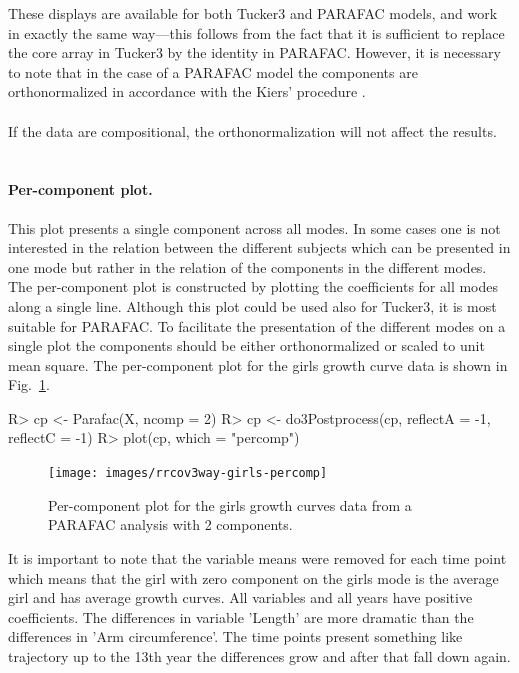 \documentclass[article,shortnames, nojss]{jss}
\begin{document}
These displays are available for both Tucker3 and PARAFAC models, and
work in exactly the same way---this follows from the fact that
it is sufficient to replace the core array in Tucker3 by the
identity in PARAFAC. However, it is necessary to note that in the case of
a PARAFAC model the components are orthonormalized in accordance with
the Kiers' procedure \citep{kiers2000some}.\\\\
If the data are compositional, the orthonormalization will not affect the results.\\\\
\paragraph{Per-component plot.} This plot presents a single component across all modes.
In some cases one is not interested in the relation between the
different subjects which can be presented in one mode but rather in the relation
of the components in the different modes. The per-component plot is
constructed by plotting the coefficients for all modes along a single line.
Although this plot could be used also for Tucker3, it is most
suitable for PARAFAC. To facilitate the presentation of the different modes
on a single plot the components should be either orthonormalized or
scaled to unit mean square. The per-component plot for the girls
growth curve data is shown in Fig.~\ref{fig-girls-percomp}.
\begin{Schunk}
\begin{Sinput}
R> cp <- Parafac(X, ncomp = 2)
R> cp <- do3Postprocess(cp, reflectA = -1, reflectC = -1)
R> plot(cp, which = "percomp")
\end{Sinput}
\end{Schunk}
\begin{figure}[H]
\centering
\texttt{[image: images/rrcov3way-girls-percomp]}
\caption{Per-component plot for the girls growth curves data from a PARAFAC analysis with 2 components.}
\label{fig-girls-percomp}
\end{figure}
It is important to note that the variable means were removed for each
time point which means that the girl with zero component on the girls mode
is the average girl and has average growth curves. All variables and all
years have positive coefficients. The differences in variable 'Length' are
more dramatic than the differences in 'Arm circumference'. The time points
present something like trajectory up to the 13th year the differences
grow and after that fall down again.
\end{document}
